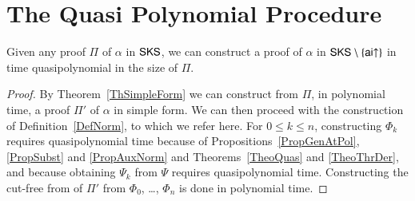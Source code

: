 

\section{The Quasi Polynomial Procedure}



\begin{theorem}\label{ThPreNorm}
Given any proof\/ $\Pi$ of $\alpha$ in\/ $\mathsf{SKS}$, we can construct a proof of $\alpha$ in\/ $\mathsf{SKS}\setminus\{\mathsf{ai}{\uparrow}\}$ in time quasipolynomial in the size of\/ $\Pi$.
\end{theorem}

\begin{proof}
By Theorem~\ref{ThSimpleForm} we can construct from $\Pi$, in polynomial time, a proof $\Pi'$ of $\alpha$ in simple form. We can then proceed with the construction of Definition~\ref{DefNorm}, to which we refer here. For $0\le k\le n$, constructing $\Phi_k$ requires quasipolynomial time because of Propositions~\ref{PropGenAtPol}, \ref{PropSubst} and \ref{PropAuxNorm} and Theorems~\ref{TheoQuas} and \ref{TheoThrDer}, and because obtaining $\Psi_k$ from $\Psi$ requires quasipolynomial time. Constructing the cut-free from of $\Pi'$ from $\Phi_0$, \dots, $\Phi_n$ is done in polynomial time.
\end{proof}
